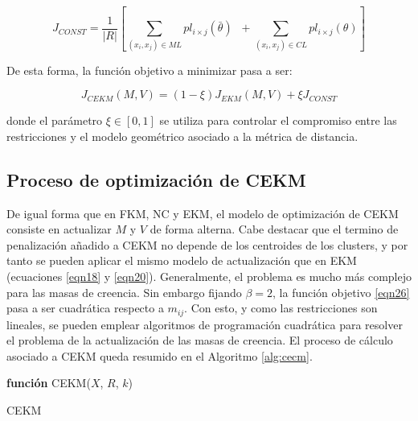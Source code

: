 \begin{equation}
J_{CONST} = \frac{1}{|R|} \left[\sum_{(x_i,x_j) \in ML} pl_{i\times j} (\bar{\theta})\;\; + \sum_{(x_i,x_j) \in CL} pl_{i\times j} (\theta)\right]
\label{eqn25}
\end{equation}

De esta forma, la función objetivo a minimizar pasa a ser:

\begin{equation}
J_{CEKM}(M,V) = (1- \xi)J_{EKM}(M,V) + \xi J_{CONST}
\label{eqn26}
\end{equation}

donde el parámetro $\xi \in [0,1]$ se utiliza para controlar el compromiso entre las restricciones y el modelo geométrico asociado a la métrica de distancia.

\subsection{Proceso de optimización de CEKM}

De igual forma que en \acs{FKM}, \acs{NC} y \acs{EKM}, el modelo de optimización de \acs{CEKM} consiste en actualizar $M$ y $V$ de forma alterna. Cabe destacar que el termino de penalización añadido a \acs{CEKM} no depende de los centroides de los clusters, y por tanto se pueden aplicar el mismo modelo de actualización que en \acs{EKM} (ecuaciones \ref{eqn18} y \ref{eqn20}). Generalmente, el problema es mucho más complejo para las masas de creencia. Sin embargo fijando $\beta = 2$, la función objetivo \ref{eqn26} pasa a ser cuadrática respecto a $m_{ij}$. Con esto, y como las restricciones son lineales, se pueden emplear algoritmos de programación cuadrática para resolver el problema de la actualización de las masas de creencia. El proceso de cálculo asociado a \acs{CEKM} queda resumido en el Algoritmo \ref{alg:cecm}. 


\begin{algorithm}
	
	\BlankLine
	\BlankLine
	\textbf{función} CEKM($X$, $R$, $k$) 
	\caption{\acs{CEKM}}
	\label{alg:cecm}
\end{algorithm}

